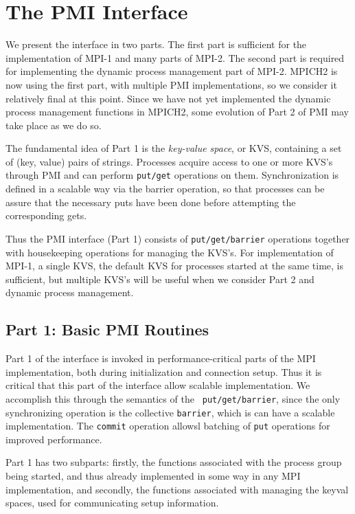 \documentclass[11pt]{article}
\begin{document}
\section{The PMI Interface}
\label{sec:interface}

We present the interface in two parts.  The first part is sufficient for
the implementation of MPI-1 and many parts of MPI-2.  The second part is
required for implementing the dynamic process management part of MPI-2.
MPICH2 is now using the first part, with multiple PMI implementations,
so we consider it relatively final at this point.  Since we have not yet
implemented the dynamic process management functions in MPICH2, some
evolution of Part 2 of PMI may take place as we do so.

The fundamental idea of Part 1 is the {\em key-value space}, or KVS,
containing a set of (key, value) pairs of strings.  Processes acquire 
access to one or more KVS's through PMI and can perform {\tt put/get}
operations on them.  Synchronization is defined in a scalable way via
the barrier operation, so that processes can be assure that the necessary
puts have been done before attempting the corresponding gets.

Thus the PMI interface (Part 1) consists of {\tt put/get/barrier} operations
together with housekeeping operations for managing the KVS's.  For
implementation of MPI-1, a single KVS, the default KVS for processes
started at the same time, is sufficient, but multiple KVS's will be
useful when we consider Part 2 and dynamic process management.


\subsection{Part 1:  Basic PMI Routines}
\label{sec:part1}

Part 1 of the interface is invoked in performance-critical parts of the
MPI implementation, both during initialization and connection setup.
Thus it is critical that this part of the interface allow scalable
implementation.  We accomplish this through the semantics of the {\tt
  put/get/barrier}, since the only synchronizing operation is the
collective {\tt barrier}, which is can have a scalable implementation.
The {\tt commit} operation allowsl batching of {\tt put} operations for
improved performance.

Part 1 has two subparts:  firstly, the functions associated with the process group
being started, and thus already implemented in some way in any MPI
implementation, and secondly, the functions associated with managing the
keyval spaces, used for communicating setup information. 
\end{document}
